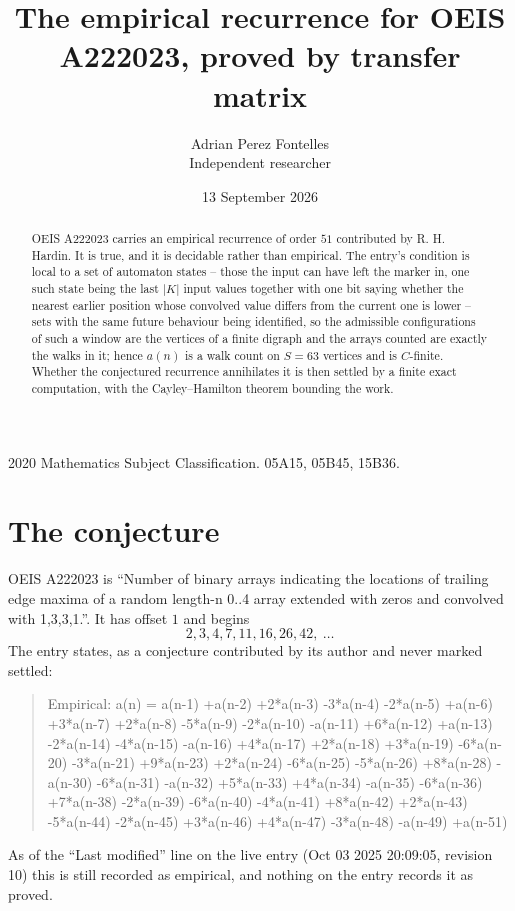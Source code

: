 \documentclass[11pt,a4paper]{article}
\title{The empirical recurrence for OEIS A222023, proved by transfer matrix}
\author{Adrian Perez Fontelles\\ \small Independent researcher}
\date{13 September 2026}
\theoremstyle{plain}
\theoremstyle{definition}
\begin{document}
\maketitle

\begin{abstract}
OEIS A222023 carries an empirical recurrence of order $51$ contributed by R. H. Hardin. It is
true, and it is decidable rather than empirical. The entry's condition is local to a set of automaton states -- those the input can have left the marker in, one such state being the last $|K|$ input values together with one bit saying whether the nearest earlier position whose convolved value differs from the current one is lower -- sets with the same future behaviour being identified, so
the admissible configurations of such a window are the vertices of a finite digraph and the
arrays counted are exactly the walks in it; hence $a(n)$ is a walk count on $S=63$ vertices
and is $C$-finite. Whether the conjectured recurrence annihilates it is then settled by a
finite exact computation, with the Cayley--Hamilton theorem bounding the work.
\end{abstract}

\noindent\small 2020 Mathematics Subject Classification. 05A15, 05B45, 15B36.\normalsize

\section{The conjecture}

OEIS A222023 is ``Number of binary arrays indicating the locations of trailing edge maxima of a random length-n 0..4 array extended with zeros and convolved with 1,3,3,1.''. It has offset $1$ and begins
\[
2, 3, 4, 7, 11, 16, 26, 42,\ \dots
\]
The entry states, as a conjecture contributed by its author and never marked settled:
\begin{quote}
Empirical: a(n) = a(n-1) +a(n-2) +2*a(n-3) -3*a(n-4) -2*a(n-5) +a(n-6) +3*a(n-7) +2*a(n-8) -5*a(n-9) -2*a(n-10) -a(n-11) +6*a(n-12) +a(n-13) -2*a(n-14) -4*a(n-15) -a(n-16) +4*a(n-17) +2*a(n-18) +3*a(n-19) -6*a(n-20) -3*a(n-21) +9*a(n-23) +2*a(n-24) -6*a(n-25) -5*a(n-26) +8*a(n-28) -a(n-30) -6*a(n-31) -a(n-32) +5*a(n-33) +4*a(n-34) -a(n-35) -6*a(n-36) +7*a(n-38) -2*a(n-39) -6*a(n-40) -4*a(n-41) +8*a(n-42) +2*a(n-43) -5*a(n-44) -2*a(n-45) +3*a(n-46) +4*a(n-47) -3*a(n-48) -a(n-49) +a(n-51)
\end{quote}
As of the ``Last modified'' line on the live entry (Oct 03 2025 20:09:05, revision 10) this is still
recorded as empirical, and nothing on the entry records it as proved.
\end{document}
